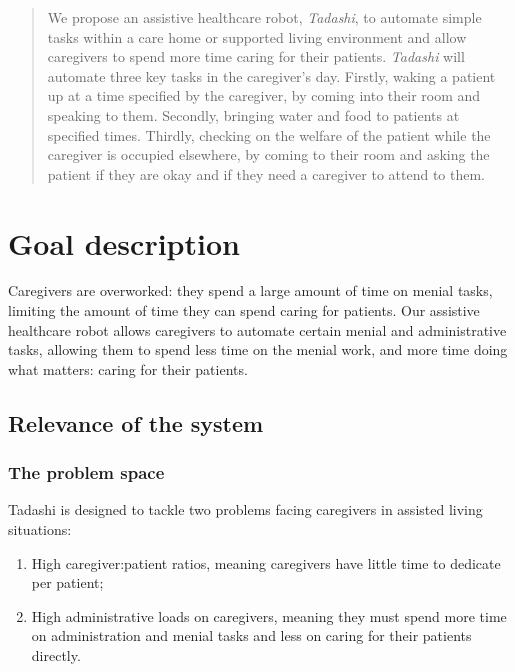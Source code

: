 \documentclass{article}
\begin{document}
 



\begin{abstract}
  We propose an assistive healthcare robot, {\it Tadashi}, to automate simple tasks within a care home or supported living environment and allow caregivers to spend more time caring for their patients.
  {\it Tadashi} will automate three key tasks in the caregiver's day. Firstly, waking a patient up at a time specified by the caregiver, by coming into their room and speaking to them. Secondly, bringing water and food to patients at specified times. Thirdly, checking on the welfare of the patient while the caregiver is occupied elsewhere, by coming to their room and asking the patient if they are okay and if they need a caregiver to attend to them. 
\end{abstract} 

\section{Goal description}
Caregivers are overworked: they spend a large amount of time on menial tasks, limiting the amount of time they can spend caring for patients. Our assistive healthcare robot allows caregivers to automate certain menial and administrative tasks, allowing them to spend less time on the menial work, and more time doing what matters: caring for their patients. 

\subsection{Relevance of the system}
\subsubsection{The problem space}
Tadashi is designed to tackle two problems facing caregivers in assisted living situations:
\begin{enumerate}
\item High caregiver:patient ratios, meaning caregivers have little time to dedicate per patient;
\item High administrative loads on caregivers, meaning they must spend more time on administration and menial tasks and less on caring for their patients directly.
\end{enumerate}
\end{document}
